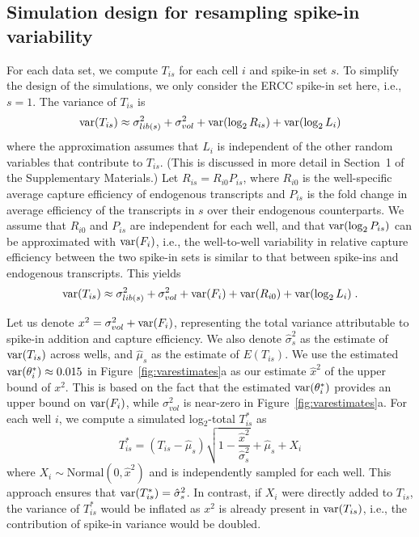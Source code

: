 \documentclass{article}
\newcommand{\suppsecmath}{1}
\begin{document}
\subsection{Simulation design for resampling spike-in variability}
For each data set, we compute $T_{is}$ for each cell $i$ and spike-in set $s$.
To simplify the design of the simulations, we only consider the ERCC spike-in set here, i.e., $s=1$.
The variance of $T_{is}$ is
\[
    \mbox{var}(T_{is}) \approx \sigma^2_{lib(s)} + \sigma^2_{vol} + \mbox{var}(\log_2 R_{is}) + \mbox{var}(\log_2 L_i)
\]
where the approximation assumes that $L_i$ is independent of the other random variables that contribute to $T_{is}$.
(This is discussed in more detail in Section~\suppsecmath{} of the Supplementary Materials.)
Let $R_{is} = R_{i0}P_{is}$, where $R_{i0}$ is the well-specific average capture efficiency of endogenous transcripts and $P_{is}$ is the fold change in average efficiency of the transcripts in $s$ over their endogenous counterparts.
We assume that $R_{i0}$ and $P_{is}$ are independent for each well, and that $\mbox{var}(\log_2 P_{is})$ can be approximated with $\mbox{var}(F_i)$,
i.e., the well-to-well variability in relative capture efficiency between the two spike-in sets is similar to that between spike-ins and endogenous transcripts.
This yields
\[
    \mbox{var}(T_{is}) \approx \sigma^2_{lib(s)} + \sigma^2_{vol} + \mbox{var}(F_i) + \mbox{var}(R_{i0}) + \mbox{var}(\log_2 L_i) \;.
\]


Let us denote $x^2 = \sigma^2_{vol} + \mbox{var}(F_i)$, representing the total variance attributable to spike-in addition and capture efficiency.
We also denote $\hat\sigma^2_s$ as the estimate of $\mbox{var}(T_{is})$ across wells, and $\hat\mu_s$ as the estimate of $E(T_{is})$.
We use the estimated $\mbox{var}(\theta^*_i) \approx 0.015$ in Figure~\ref{fig:varestimates}a as our estimate $\hat{x}^2$ of the upper bound of $x^2$.
This is based on the fact that the estimated $\mbox{var}(\theta^*_i)$ provides an upper bound on $\mbox{var}(F_i)$, while $\sigma^2_{vol}$ is near-zero in Figure~\ref{fig:varestimates}a.
For each well $i$, we compute a simulated log$_2$-total $T^*_{is}$ as
\[
    T^*_{is} = (T_{is} - \hat\mu_s)\sqrt{1-\frac{ \hat{x}^2}{\hat\sigma^2_s}} + \hat\mu_s + X_i
\]
where $X_i \sim \mbox{Normal}(0, \hat{x}^2)$ and is independently sampled for each well.
This approach ensures that $\mbox{var}(T^*_{is}) = \hat\sigma^2_s$.
In contrast, if $X_i$ were directly added to $T_{is}$, the variance of $T^*_{is}$ would be inflated as $x^2$ is already present in $\mbox{var}(T_{is})$, i.e., the contribution of spike-in variance would be doubled.
\end{document}
